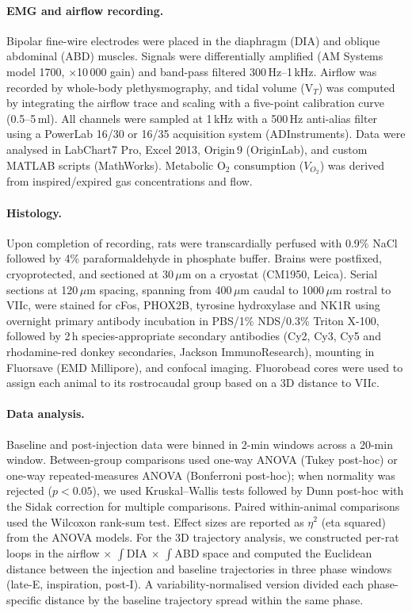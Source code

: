 \documentclass[11pt]{article}
\begin{document}
\paragraph{EMG and airflow recording.}
Bipolar fine-wire electrodes were placed in the diaphragm (DIA) and
oblique abdominal (ABD) muscles. Signals were differentially amplified
(AM Systems model 1700, $\times$10\,000 gain) and band-pass filtered
300\,Hz--1\,kHz. Airflow was recorded by whole-body plethysmography, and
tidal volume (V$_T$) was computed by integrating the airflow trace and
scaling with a five-point calibration curve (0.5--5\,ml). All channels
were sampled at 1\,kHz with a 500\,Hz anti-alias filter using a PowerLab
16/30 or 16/35 acquisition system (ADInstruments). Data were analysed in
LabChart7 Pro, Excel 2013, Origin\,9 (OriginLab), and custom MATLAB
scripts (MathWorks). Metabolic O$_2$ consumption ($V_{O_2}$) was derived
from inspired/expired gas concentrations and flow.

\paragraph{Histology.}
Upon completion of recording, rats were transcardially perfused with
0.9\% NaCl followed by 4\% paraformaldehyde in phosphate buffer. Brains
were postfixed, cryoprotected, and sectioned at 30\,$\mu$m on a cryostat
(CM1950, Leica). Serial sections at 120\,$\mu$m spacing, spanning from
400\,$\mu$m caudal to 1000\,$\mu$m rostral to VIIc, were stained for
cFos, PHOX2B, tyrosine hydroxylase and NK1R using overnight primary
antibody incubation in PBS/1\% NDS/0.3\% Triton X-100, followed by
2\,h species-appropriate secondary antibodies (Cy2, Cy3, Cy5 and
rhodamine-red donkey secondaries, Jackson ImmunoResearch), mounting in
Fluorsave (EMD Millipore), and confocal imaging. Fluorobead cores were
used to assign each animal to its rostrocaudal group based on a 3D
distance to VIIc.

\paragraph{Data analysis.}
Baseline and post-injection data were binned in 2-min windows across a
20-min window. Between-group comparisons used one-way ANOVA (Tukey
post-hoc) or one-way repeated-measures ANOVA (Bonferroni post-hoc); when
normality was rejected ($p<0.05$), we used Kruskal--Wallis tests
followed by Dunn post-hoc with the Sidak correction for multiple
comparisons. Paired within-animal comparisons used the Wilcoxon
rank-sum test. Effect sizes are reported as $\eta^2$ (eta squared) from
the ANOVA models. For the 3D trajectory analysis, we constructed per-rat
loops in the airflow $\times$ $\int$DIA $\times$ $\int$ABD space and
computed the Euclidean distance between the injection and baseline
trajectories in three phase windows (late-E, inspiration, post-I). A
variability-normalised version divided each phase-specific distance by
the baseline trajectory spread within the same phase.



\end{document}
